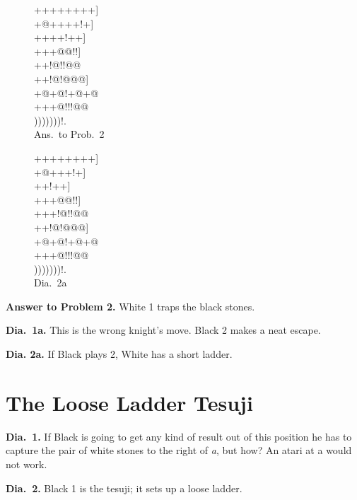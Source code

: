 \documentclass[mcrownvopaper,10pt,twopage,onecolumn,draft,showtrims]{memoir}
\begin{document}
\begin{figure}[!ht]
    \begin{minipage}[c]{0.5\linewidth}
        \centering    
        {\gnos%
        ++++++++]\\
        +@++++!+]\\
        ++{\gnosw{}}++!++]\\
        +++{\gnosb{}}@@!!]\\
        ++{\gnosw{}}!@!!@@\\
        ++!@!@@@]\\
        +@+@!+@+@\\
        +++@!!!@@\\
        )))))))!.\\
        }
        Ans.\ to Prob.\ 2
    \end{minipage}%
    \begin{minipage}[c]{0.5\linewidth}
        \centering    
        {\gnos%
        ++++++++]\\
        +@+{\gnosw{}}++!+]\\
        ++{\gnosw{}}{\gnosb{}}{\gnosb{}}!++]\\
        +++{\gnosw{}}@@!!]\\
        +++!@!!@@\\
        ++!@!@@@]\\
        +@+@!+@+@\\
        +++@!!!@@\\
        )))))))!.\\
        }
        Dia.\ 2a
    \end{minipage}%
\end{figure}

\noindent
\textbf{Answer to Problem 2.} White 1 traps the black stones.

\noindent
\textbf{Dia.\ 1a.} This is the wrong knight's move. Black 2 makes a neat escape.

\noindent
\textbf{Dia. 2a.} If Black plays 2, White has a short ladder.

\section{The Loose Ladder Tesuji}
\noindent
\textbf{Dia.\ 1.} If Black is going to get any kind of result out of this position he
has to capture the pair of white stones to the right of \textit{a}, but how? An
atari at a would not work.

\noindent
\textbf{Dia.\ 2.} Black 1 is the tesuji; it sets up a loose ladder.
\end{document}
